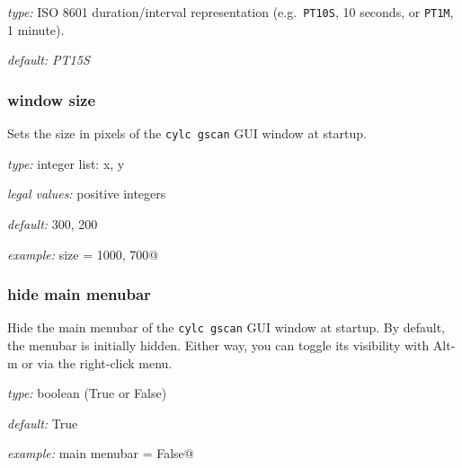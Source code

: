 \begin{myitemize}
\item {\em type:} ISO 8601 duration/interval representation (e.g.\ 
\lstinline=PT10S=, 10 seconds, or \lstinline=PT1M=, 1 minute).
\item {\em default: PT15S}
\end{myitemize}

\subsubsection{window size}

Sets the size in pixels of the \lstinline=cylc gscan= GUI window at startup.

\begin{myitemize}
    \item {\em type:} integer list: x, y
    \item {\em legal values:} positive integers
    \item {\em default:} 300, 200
    \item {\em example:} \lstinline@window size = 1000, 700@
\end{myitemize}

\subsubsection{hide main menubar}

Hide the main menubar of the \lstinline=cylc gscan= GUI window at startup. By
default, the menubar is initially hidden. Either way, you can toggle its
visibility with Alt-m or via the right-click menu.

\begin{myitemize}
  \item {\em type:} boolean (True or False)
    \item {\em default:} True
    \item {\em example:} \lstinline@hide main menubar = False@
\end{myitemize}
